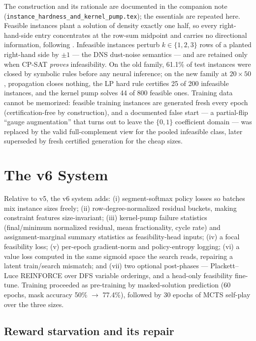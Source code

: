 \documentclass[12pt]{article}
\begin{document}
The construction and its rationale are documented in the companion note (\texttt{instance\_hardness\_and\_kernel\_pump.tex}); the essentials are repeated here. Feasible instances plant a solution of density exactly one half, so every right-hand-side entry concentrates at the row-sum midpoint and carries no directional information, following \citet{cornuejols1998market}. Infeasible instances perturb $k \in \{1,2,3\}$ rows of a planted right-hand side by $\pm 1$ --- the DNS dust-noise semantics --- and are retained only when CP-SAT \emph{proves} infeasibility. On the old family, 61.1\% of test instances were closed by symbolic rules before any neural inference; on the new family at $20 \times 50$, propagation closes nothing, the LP hard rule certifies 25 of 200 infeasible instances, and the kernel pump solves 44 of 800 feasible ones. Training data cannot be memorized: feasible training instances are generated fresh every epoch (certification-free by construction), and a documented false start --- a partial-flip ``gauge augmentation'' that turns out to leave the $\{0,1\}$ coefficient domain --- was replaced by the valid full-complement view for the pooled infeasible class, later superseded by fresh certified generation for the cheap sizes.

\section{The v6 System}

Relative to v5, the v6 system adds: (i) segment-softmax policy losses so batches mix instance sizes freely; (ii) row-degree-normalized residual buckets, making constraint features size-invariant; (iii) kernel-pump failure statistics (final/minimum normalized residual, mean fractionality, cycle rate) and assignment-marginal summary statistics as feasibility-head inputs; (iv) a focal feasibility loss; (v) per-epoch gradient-norm and policy-entropy logging; (vi) a value loss computed in the same sigmoid space the search reads, repairing a latent train/search mismatch; and (vii) two optional post-phases --- Plackett--Luce REINFORCE over DFS variable orderings, and a head-only feasibility fine-tune. Training proceeded as pre-training by masked-solution prediction (60 epochs, mask accuracy 50\% $\rightarrow$ 77.4\%), followed by 30 epochs of MCTS self-play over the three sizes.

\subsection{Reward starvation and its repair}
\end{document}
